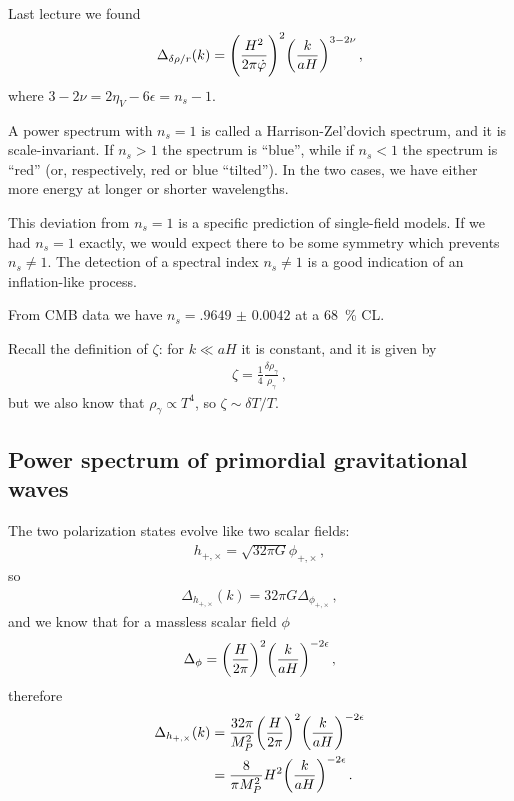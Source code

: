\documentclass[main.tex]{subfiles}
\begin{document}

Last lecture we found 
%
\begin{align}
\Delta_{ \delta \rho / r } (k) 
= \qty(\frac{H^2}{2 \pi \dot{\varphi}})^2 \qty(\frac{k}{aH})^{3-2\nu }
\,,
\end{align}
%
where \(3 - 2 \nu = 2 \eta _V - 6 \epsilon = n_s -1\). 

A power spectrum with \(n_s = 1\) is called a Harrison-Zel'dovich spectrum, and it is scale-invariant.
If \(n_s > 1\) the spectrum is ``blue'', while if \(n_s < 1\) the spectrum is ``red'' (or, respectively, red or blue ``tilted''). 
In the two cases, we have either more energy at longer or shorter wavelengths.

This deviation from \(n_s = 1\) is a specific prediction of single-field models.
If we had \(n_s = 1\) exactly, we would expect there to be some symmetry which prevents \(n_s \neq 1\). 
The detection of a spectral index \(n_s \neq 1\) is a good indication of an inflation-like process. 

From CMB data \cite[eq.\ 21]{planckcollaborationPlanck2018Results2019} we have \(n_s = \num{.9649(42)}\) at a \SI{68}{\percent} CL.

Recall the definition of \(\zeta \): for \(k \ll aH\) it is constant, and it is given by 
%
\begin{align}
\zeta = \frac{1}{4} \frac{ \delta \rho _\gamma }{\rho _\gamma }
\,,
\end{align}
%
but we also know that \(\rho _\gamma \propto T^{4}\), so \(\zeta \sim \delta T / T\). 

\subsection{Power spectrum of primordial gravitational waves}

The two polarization states evolve like two scalar fields:
%
\begin{align}
h_{+, \times } = \sqrt{32 \pi G} \phi_{+, \times}
\,,
\end{align}
%
so 
%
\begin{align}
\Delta_{h_{+, \times }} (k) = 32 \pi G \Delta_{\phi_{+, \times }}
\,,
\end{align}
%
and we know that for a massless scalar field \(\phi  \)
%
\begin{align}
\Delta_{\phi} = \qty(\frac{H}{2 \pi })^{2} \qty(\frac{k}{aH})^{-2\epsilon }
\,,
\end{align}
%
therefore 
%
\begin{align}
\Delta_{h_{+, \times }} (k)
&= \frac{32 \pi }{M_P^2} \qty(\frac{H}{2 \pi })^2 \qty(\frac{k}{aH})^{-2 \epsilon }  \\
&= \frac{8}{\pi M_P^2} H^2 \qty(\frac{k}{aH})^{-2 \epsilon }
\,.
\end{align}
\end{document}
